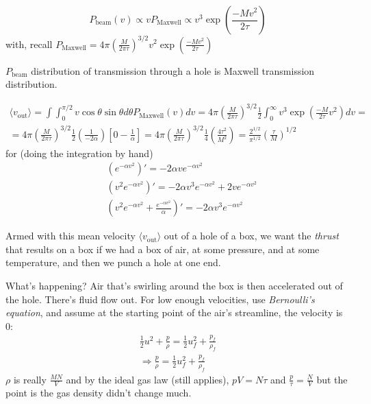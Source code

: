 \documentclass[10pt]{amsart}
\begin{document}
\begin{multicols*}{2}
\[
P_{\text{beam}}(v) \propto vP_{\text{Maxwell} } \propto v^3 \exp{ \left( \frac{ -Mv^2}{ 2\tau } \right) }
\]
with, recall $P_{\text{Maxwell}} = 4\pi \left( \frac{ M }{ 2\pi \tau } \right)^{3/2} v^2 \exp{ \left( \frac{-Mv^2}{ 2\tau } \right) }$ 

$P_{\text{beam}}$ distribution of transmission through a hole is Maxwell transmission distribution. 

\begin{equation}\label{Eq:meanvofairbeamouthole}
\begin{gathered}
  \langle v_{\text{out}} \rangle = \int \int_0^{\pi/2} v\cos{\theta} \sin{\theta} d\theta P_{\text{Maxwell}}(v) dv = 4\pi \left( \frac{ M}{ 2\pi \tau} \right)^{3/2} \frac{1}{2} \int_0^{\infty} v^3 \exp{ \left( \frac{-M}{2\tau} v^2 \right) } dv = \\
  = 4\pi \left( \frac{M}{2\pi \tau} \right)^{3/2} \frac{1}{2} \left( \frac{1}{-2\alpha} \right) \left[ 0 - \frac{1}{\alpha} \right] = 4\pi \left( \frac{ M}{2\pi \tau} \right)^{3/2} \frac{1}{4} \left( \frac{4\tau^2}{M^2} \right) = \boxed{ \frac{ 2^{1/2} }{ \pi^{1/2} } \left( \frac{\tau}{M} \right)^{1/2} }
\end{gathered}
\end{equation}
for (doing the integration by hand) 
\[
\begin{aligned}
  & (e^{-\alpha v^2} )' = -2\alpha v e^{-\alpha v^2} \\
  & (v^2 e^{-\alpha v^2} )' = -2\alpha v^3 e^{-\alpha v^2} + 2v e^{-\alpha v^2} \\ 
  & (v^2 e^{-\alpha v^2} + \frac{e^{-\alpha v^2} }{ \alpha } )' = -2\alpha v^3 e^{-\alpha v^2}
\end{aligned}
\]

Armed with this mean velocity $\langle v_{\text{out}} \rangle$ out of a hole of a box, we want the \emph{thrust} that results on a box if we had a box of air, at some pressure, and at some temperature, and then we punch a hole at one end.  

What's happening?  Air that's swirling around the box is then accelerated out of the hole.  There's fluid flow out.  For low enough velocities, use \emph{Bernoulli's equation}, and assume at the starting point of the air's streamline, the velocity is $0$:
\[
\begin{gathered}
  \frac{1}{2} u^2 + \frac{p}{\rho} = \frac{1}{2}u_f^2 + \frac{p_f}{\rho_f} \\
  \Longrightarrow \frac{p}{\rho}  = \frac{1}{2} u_f^2 + \frac{p_f}{\rho_f}
\end{gathered}
\]
$\rho$ is really $\frac{MN}{V}$ and by the ideal gas law (still applies), $pV=N\tau$ and $\frac{p}{\tau} = \frac{N}{V}$ but the point is the gas density didn't change much.  


\end{multicols*}
\end{document}
